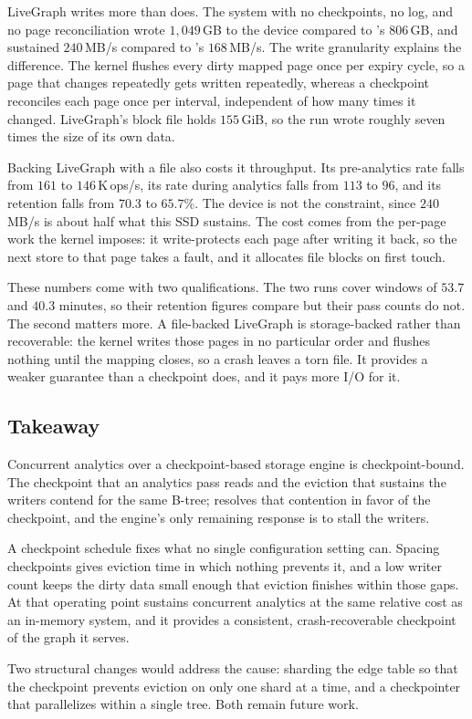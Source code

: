 LiveGraph writes more than \project{} does.
The system with no checkpoints, no log, and no page reconciliation wrote $1{,}049$\,GB to the device compared to \project{}'s $806$\,GB, and sustained $240$\,MB/s compared to \project{}'s $168$\,MB/s.
The write granularity explains the difference.
The kernel flushes every dirty mapped page once per expiry cycle, so a page that changes repeatedly gets written repeatedly, whereas a checkpoint reconciles each page once per interval, independent of how many times it changed.
LiveGraph's block file holds $155$\,GiB, so the run wrote roughly seven times the size of its own data.

Backing LiveGraph with a file also costs it throughput.
Its pre-analytics rate falls from $161$ to $146$\,K\,ops/s, its rate during analytics falls from $113$ to $96$, and its retention falls from $70.3$ to $65.7\%$.
The device is not the constraint, since $240$\,MB/s is about half what this SSD sustains.
The cost comes from the per-page work the kernel imposes: it write-protects each page after writing it back, so the next store to that page takes a fault, and it allocates file blocks on first touch.

These numbers come with two qualifications.
The two runs cover windows of $53.7$ and $40.3$ minutes, so their retention figures compare but their pass counts do not.
The second matters more.
A file-backed LiveGraph is storage-backed rather than recoverable: the kernel writes those pages in no particular order and flushes nothing until the mapping closes, so a crash leaves a torn file.
It provides a weaker guarantee than a checkpoint does, and it pays more I/O for it.

\subsection{Takeaway}
\label{sec:eval:dynamic:concurrent:takeaway}

Concurrent analytics over a checkpoint-based storage engine is checkpoint-bound.
The checkpoint that an analytics pass reads and the eviction that sustains the writers contend for the same B-tree; \wt{} resolves that contention in favor of the checkpoint, and the engine's only remaining response is to stall the writers.

A checkpoint schedule fixes what no single configuration setting can.
Spacing checkpoints gives eviction time in which nothing prevents it, and a low writer count keeps the dirty data small enough that eviction finishes within those gaps.
At that operating point \project{} sustains concurrent analytics at the same relative cost as an in-memory system, and it provides a consistent, crash-recoverable checkpoint of the graph it serves.

Two structural changes would address the cause: sharding the edge table so that the checkpoint prevents eviction on only one shard at a time, and a checkpointer that parallelizes within a single tree.
Both remain future work.